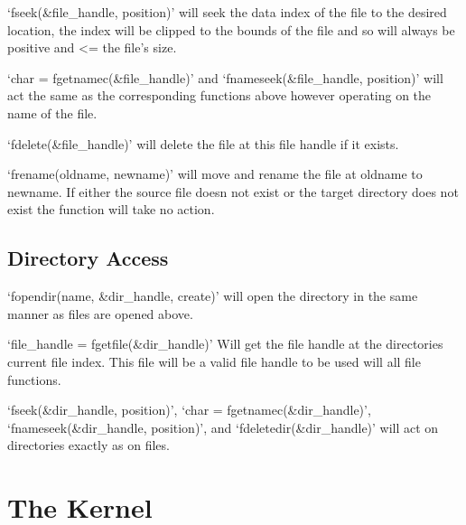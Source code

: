 \documentclass[a4paper]{report}
\begin{document}
\vspace{1.5mm}
\noindent
`fseek(\&file\_handle, position)' will seek the data index of the file to the desired location, the index will be clipped to the bounds of the file and so will always be positive and \textless = the file's size.

\vspace{1.5mm}
\noindent
`char = fgetnamec(\&file\_handle)' and `fnameseek(\&file\_handle, position)' will act the same as the corresponding functions above however operating on the name of the file.

\vspace{1.5mm}
\noindent
`fdelete(\&file\_handle)' will delete the file at this file handle if it exists.

\vspace{1.5mm}
\noindent
`frename(oldname, newname)' will move and rename the file at oldname to newname. If either the source file doesn not exist or the target directory does not exist the function will take no action.


\subsection{Directory Access}

\vspace{1.5mm}
\noindent
`fopendir(name, \&dir\_handle, create)' will open the directory in the same manner as files are opened above.


\vspace{1.5mm}
\noindent
`file\_handle = fgetfile(\&dir\_handle)' Will get the file handle at the directories current file index. This file will be a valid file handle to be used will all file functions.

\vspace{1.5mm}
\noindent
`fseek(\&dir\_handle, position)', `char = fgetnamec(\&dir\_handle)', `fnameseek(\&dir\_handle, position)', and `fdeletedir(\&dir\_handle)' will act on directories exactly as on files.























\section{The Kernel}
\end{document}
